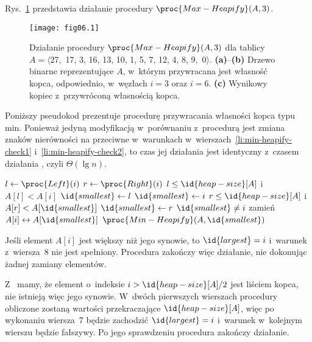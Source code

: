 
\exercise %
Rys.~\ref{fig:6.2-1} przedstawia działanie procedury $\proc{Max-Heapify}(A,3)$.
\begin{figure}[ht]
	\begin{center}
		\texttt{[image: fig06.1]}
	\end{center}
	\caption{Działanie procedury $\proc{Max-Heapify}(A,3)$ dla tablicy $A=\langle$27,~17, 3, 16, 13, 10, 1, 5, 7, 12, 4, 8, 9,~0$\rangle$. {\sffamily\bfseries(a)}--{\sffamily\bfseries(b)} Drzewo binarne reprezentujące $A$, w~którym przywracana jest własność kopca, odpowiednio, w~węzłach $i=3$ oraz $i=6$. {\sffamily\bfseries(c)} Wynikowy kopiec z~przywróconą własnością kopca.} \label{fig:6.2-1}
\end{figure}

\exercise %
Poniższy pseudokod prezentuje procedurę przywracania własności kopca typu min. Ponieważ jedyną modyfikacją w~porównaniu z~procedurą  jest zmiana znaków nierówności na przeciwne w~warunkach w~wierszach~\ref{li:min-heapify-check1} i~\ref{li:min-heapify-check2}, to czas jej działania jest identyczny z~czasem działania , czyli $\Theta(\lg n)$.
\begin{codebox}
\li	$l\gets\proc{Left}(i)$
\li	$r\gets\proc{Right}(i)$
\li	\If $l\le\id{heap-size}[A]$ i~$A[l]<A[i]$ \label{li:min-heapify-check1}
\li		\Then $\id{smallest}\gets l$
\li		\Else $\id{smallest}\gets i$
		\End
\li	\If $r\le\id{heap-size}[A]$ i~$A[r]<A[\id{smallest}]$ \label{li:min-heapify-check2}
\li		\Then $\id{smallest}\gets r$
		\End
\li	\If $\id{smallest}\ne i$
\li		\Then
			zamień $A[i]\leftrightarrow A[\id{smallest}]$
\li			$\proc{Min-Heapify}(A,\id{smallest})$
		\End
\end{codebox}

\exercise %
Jeśli element $A[i]$ jest większy niż jego synowie, to $\id{largest}=i$ i~warunek z~wiersza~8 nie jest spełniony. Procedura zakończy więc działanie, nie dokonując żadnej zamiany elementów.

\exercise %
Z~ mamy, że element o~indeksie $i>\id{heap-size}[A]/2$ jest liściem kopca, nie istnieją więc jego synowie. W~dwóch pierwszych wierszach procedury  obliczone zostaną wartości przekraczające $\id{heap-size}[A]$, więc po wykonaniu wiersza~7 będzie zachodzić $\id{largest}=i$ i~warunek w~kolejnym wierszu będzie fałszywy. Po jego sprawdzeniu procedura zakończy działanie.

